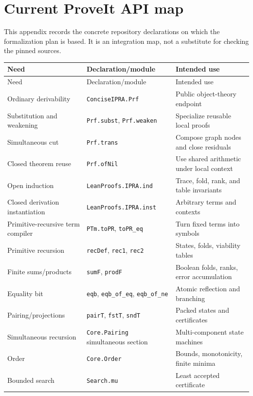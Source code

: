 \section{Current ProveIt API map}
\label{app:api}

This appendix records the concrete repository declarations on which the formalization plan is based.  It is an integration map, not a substitute for checking the pinned sources.

\begin{longtable}{@{}p{}p{}p{}@{}}
\toprule
Need & Declaration/module & Intended use \\
\midrule
\endfirsthead
\toprule
Need & Declaration/module & Intended use \\
\midrule
\endhead
Ordinary derivability & \texttt{ConciseIPRA.Prf} & Public object-theory endpoint \\
Substitution and weakening & \texttt{Prf.subst}, \texttt{Prf.weaken} & Specialize reusable local proofs \\
Simultaneous cut & \texttt{Prf.trans} & Compose graph nodes and close residuals \\
Closed theorem reuse & \texttt{Prf.ofNil} & Use shared arithmetic under local context \\
Open induction & \texttt{LeanProofs.IPRA.ind} & Trace, fold, rank, and table invariants \\
Closed derivation instantiation & \texttt{LeanProofs.IPRA.inst} & Arbitrary terms and contexts \\
Primitive-recursive term compiler & \texttt{PTm.toPR}, \texttt{toPR\_eq} & Turn fixed terms into symbols \\
Primitive recursion & \texttt{recDef}, \texttt{rec1}, \texttt{rec2} & States, folds, viability tables \\
Finite sums/products & \texttt{sumF}, \texttt{prodF} & Boolean folds, ranks, error accumulation \\
Equality bit & \texttt{eqb}, \texttt{eqb\_of\_eq}, \texttt{eqb\_of\_ne} & Atomic reflection and branching \\
Pairing/projections & \texttt{pairT}, \texttt{fstT}, \texttt{sndT} & Packed states and certificates \\
Simultaneous recursion & \texttt{Core.Pairing} simultaneous section & Multi-component state machines \\
Order & \texttt{Core.Order} & Bounds, monotonicity, finite minima \\
Bounded search & \texttt{Search.mu} & Least accepted certificate \\

\end{longtable}
